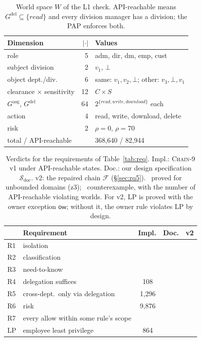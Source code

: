 \documentclass[sigconf,review,anonymous]{acmart}
\newcommand{\chain}{\textsc{Chain-9}\xspace}
\newcommand{\ow}{\mathsf{ow}}
\newcommand{\Gasg}{G^{\mathrm{asg}}}
\newcommand{\Gdel}{G^{\mathrm{del}}}
\newcommand{\ok}{\ding{51}}
\newcommand{\no}{\ding{55}}
\begin{document}
\begin{table}[t]
\caption{World space $W$ of the L1 check. API-reachable means $\Gdel\subseteq\{\mathit{read}\}$ and every
division manager has a division; the PAP enforces both.}
\label{tab:world}
\small
\begin{tabular}{@{}lrl@{}}
\toprule
Dimension & $|\cdot|$ & Values \\
\midrule
role & 5 & adm, dir, dm, emp, cust \\
subject division & 2 & $v_1$, $\bot$ \\
object dept./div. & 6 & same: $v_1,v_2,\bot$; other: $v_3,\bot,v_1$ \\
clearance $\times$ sensitivity & 12 & $C\times S$ \\
$\Gasg$, $\Gdel$ & 64 & $2^{\{\mathit{read},\mathit{write},\mathit{download}\}}$ each \\
action & 4 & read, write, download, delete \\
risk & 2 & $\rho=0$, $\rho=70$ \\
\midrule
total / API-reachable & & 368{,}640 / 82{,}944 \\
\bottomrule
\end{tabular}
\end{table}

\begin{table}[t]
\caption{Verdicts for the requirements of Table~\ref{tab:req}. Impl.: \chain v1 under API-reachable states.
Doc.: our design specification $\mathcal{S}_{\mathrm{doc}}$. v2: the repaired chain $\mathcal{F}$ (\S\ref{sec:rq5}).
\ok\ proved for unbounded domains (z3); \no\ counterexample, with the number of API-reachable violating worlds.
For v2, LP is proved with the owner exception $\ow$; without it, the owner rule violates LP by design.}
\label{tab:verdict}
\small
\begin{tabular}{@{}l@{\;}p{3.9cm}@{\;}c@{\;}c@{\;}c@{}}
\toprule
 & Requirement & Impl. & Doc. & v2 \\
\midrule
R1 & isolation & \ok & \ok & \ok \\
R2 & classification & \ok & \ok & \ok \\
R3 & need-to-know & \ok & \no & \ok \\
R4 & delegation suffices & \no\,108 & \no & \ok \\
R5 & cross-dept.\ only via delegation & \no\,1{,}296 & \ok & \ok \\
R6 & risk & \no\,9{,}876 & \no & \ok \\
R7 & every allow within some rule's scope & \ok & \no & \ok \\
\midrule
LP & employee least privilege & \no\,864 & \ok & \ok \\
\bottomrule
\end{tabular}
\end{table}
\end{document}
